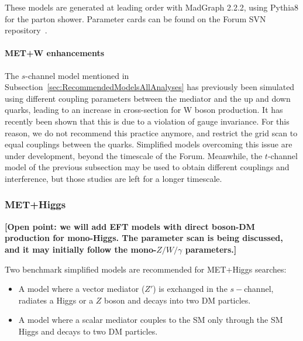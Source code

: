 \documentclass[a4,debug,notitlepage,nobib]{tufte-handout}
\begin{document}
These models are generated at leading
order with MadGraph 2.2.2, using Pythia8 for the parton shower.
Parameter cards can be found on the Forum SVN repository~\cite{ForumSVN_EWEFTD7}.

\paragraph{MET+W enhancements} The $s$-channel model mentioned in
Subsection~\ref{sec:RecommendedModelsAllAnalyses} has previously been
simulated using different coupling parameters between the mediator and
the up and down quarks, leading to an increase in cross-section for W
boson production. It has recently been shown \cite{Bell:2015sza} that
this is due to a violation of gauge invariance. For this reason, we do
not recommend this practice anymore, and restrict the grid scan to
equal couplings between the quarks. Simplified models overcoming this
issue are under development, beyond the timescale of the Forum.
Meanwhile, the $t$-channel model of the previous subsection may be
used to obtain different couplings and interference, but those studies
are left for a longer timescale.

\subsubsection{MET+Higgs} 

\textbf{[Open point: we will add EFT models with direct boson-DM production 
for mono-Higgs. The parameter scan is being discussed, and 
it may initially follow the mono-$Z/W/\gamma$ parameters.]}

Two benchmark simplified models \cite{Carpenter:2013xra} 
are recommended for MET+Higgs searches:
\begin{itemize}
 \item A model where a vector mediator ($Z'$) is exchanged in the $s-$channel, 
 radiates a Higgs or a $Z$ boson and decays into two DM particles. 
 \item A model where a scalar mediator couples to the SM only 
 through the SM Higgs and decays to two DM particles. 
\end{itemize}
\end{document}
